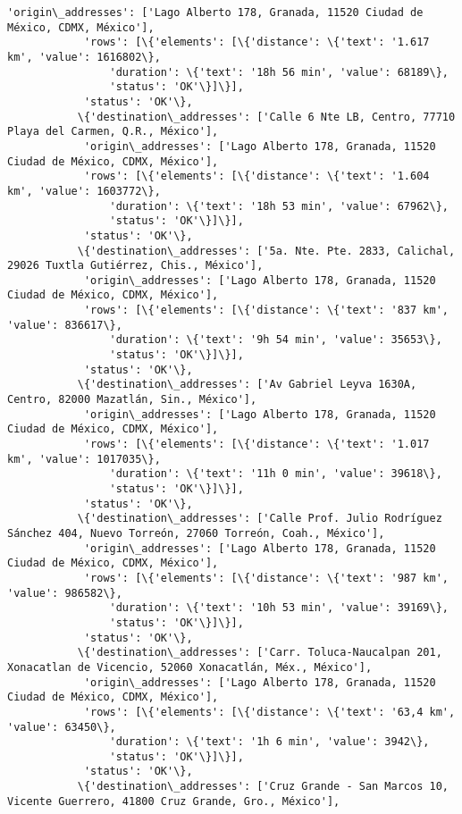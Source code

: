 \documentclass[11pt]{article}
\begin{document}
\begin{Verbatim}[commandchars=\\\{\}]
            'origin\_addresses': ['Lago Alberto 178, Granada, 11520 Ciudad de México, CDMX, México'],
            'rows': [\{'elements': [\{'distance': \{'text': '1.617 km', 'value': 1616802\},
                'duration': \{'text': '18h 56 min', 'value': 68189\},
                'status': 'OK'\}]\}],
            'status': 'OK'\},
           \{'destination\_addresses': ['Calle 6 Nte LB, Centro, 77710 Playa del Carmen, Q.R., México'],
            'origin\_addresses': ['Lago Alberto 178, Granada, 11520 Ciudad de México, CDMX, México'],
            'rows': [\{'elements': [\{'distance': \{'text': '1.604 km', 'value': 1603772\},
                'duration': \{'text': '18h 53 min', 'value': 67962\},
                'status': 'OK'\}]\}],
            'status': 'OK'\},
           \{'destination\_addresses': ['5a. Nte. Pte. 2833, Calichal, 29026 Tuxtla Gutiérrez, Chis., México'],
            'origin\_addresses': ['Lago Alberto 178, Granada, 11520 Ciudad de México, CDMX, México'],
            'rows': [\{'elements': [\{'distance': \{'text': '837 km', 'value': 836617\},
                'duration': \{'text': '9h 54 min', 'value': 35653\},
                'status': 'OK'\}]\}],
            'status': 'OK'\},
           \{'destination\_addresses': ['Av Gabriel Leyva 1630A, Centro, 82000 Mazatlán, Sin., México'],
            'origin\_addresses': ['Lago Alberto 178, Granada, 11520 Ciudad de México, CDMX, México'],
            'rows': [\{'elements': [\{'distance': \{'text': '1.017 km', 'value': 1017035\},
                'duration': \{'text': '11h 0 min', 'value': 39618\},
                'status': 'OK'\}]\}],
            'status': 'OK'\},
           \{'destination\_addresses': ['Calle Prof. Julio Rodríguez Sánchez 404, Nuevo Torreón, 27060 Torreón, Coah., México'],
            'origin\_addresses': ['Lago Alberto 178, Granada, 11520 Ciudad de México, CDMX, México'],
            'rows': [\{'elements': [\{'distance': \{'text': '987 km', 'value': 986582\},
                'duration': \{'text': '10h 53 min', 'value': 39169\},
                'status': 'OK'\}]\}],
            'status': 'OK'\},
           \{'destination\_addresses': ['Carr. Toluca-Naucalpan 201, Xonacatlan de Vicencio, 52060 Xonacatlán, Méx., México'],
            'origin\_addresses': ['Lago Alberto 178, Granada, 11520 Ciudad de México, CDMX, México'],
            'rows': [\{'elements': [\{'distance': \{'text': '63,4 km', 'value': 63450\},
                'duration': \{'text': '1h 6 min', 'value': 3942\},
                'status': 'OK'\}]\}],
            'status': 'OK'\},
           \{'destination\_addresses': ['Cruz Grande - San Marcos 10, Vicente Guerrero, 41800 Cruz Grande, Gro., México'],

\end{Verbatim}
\end{document}
